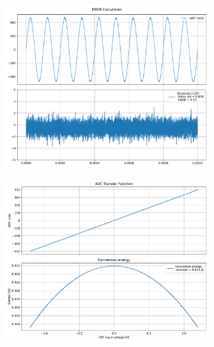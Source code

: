 \documentclass[varwidth]{standalone}
\begin{document}
\begin{figure}
\begin{subfigure}{0.32\textwidth}
    \includegraphics[width=\textwidth]{behavioral_10b_seterror_splitmsb_enob.pdf}
\end{subfigure}
\begin{subfigure}{0.32\textwidth}
    \begin{table}
    \let\center\empty
    \let\endcenter\relax
    \centering
    \resizebox{0.3\width}{!}{}
    \end{table}
    \includegraphics[width=\textwidth]{behavioral_10b_seterror_splitmsb_energy.pdf}
\end{subfigure}
\end{figure}
\end{document}

